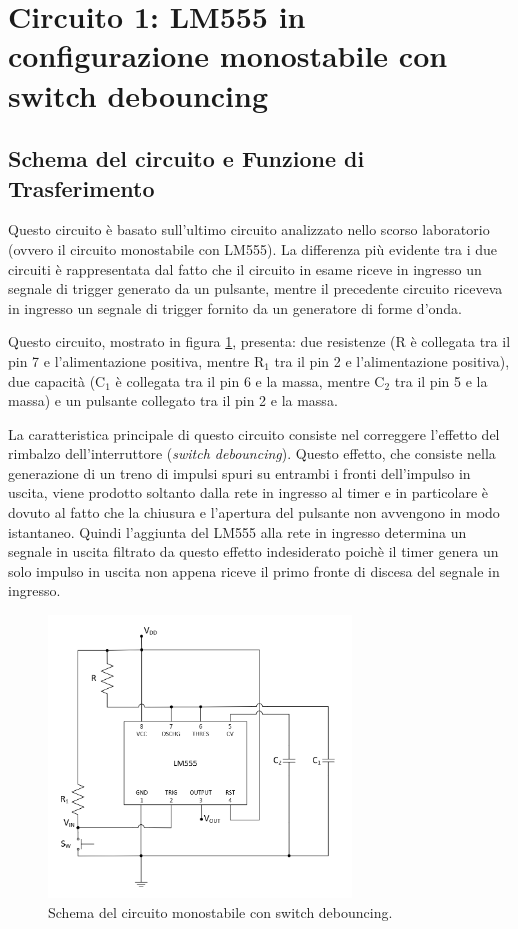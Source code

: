 \documentclass{report}
\begin{document}
\newpage
\section{Circuito 1: LM555 in configurazione monostabile con switch debouncing}
\subsection{Schema del circuito e Funzione di Trasferimento}
Questo circuito è basato sull'ultimo circuito analizzato nello scorso laboratorio (ovvero il circuito monostabile con LM555). La differenza più evidente tra i due circuiti è rappresentata dal fatto che il circuito in esame riceve in ingresso un segnale di trigger generato da un pulsante, mentre il precedente circuito riceveva in ingresso un segnale di trigger fornito da un generatore di forme d'onda.

Questo circuito, mostrato in figura \ref{figura:schema1}, presenta: due resistenze (R è collegata tra il pin 7 e l'alimentazione positiva, mentre $\mathrm{R_1}$ tra il pin 2 e l'alimentazione positiva), due capacità ($\mathrm{C_1}$ è collegata tra il pin 6 e la massa, mentre $\mathrm{C_2}$ tra il pin 5 e la massa) e un pulsante collegato tra il pin 2 e la massa.

La caratteristica principale di questo circuito consiste nel correggere l'effetto del rimbalzo dell'interruttore (\textit{switch debouncing}). Questo effetto, che consiste nella generazione di un treno di impulsi spuri su entrambi i fronti dell'impulso in uscita, viene prodotto soltanto dalla rete in ingresso al timer e in particolare è dovuto al fatto che la chiusura e l'apertura del pulsante non avvengono in modo istantaneo. Quindi l'aggiunta del LM555 alla rete in ingresso determina un segnale in uscita filtrato da questo effetto indesiderato poichè il timer genera un solo impulso in uscita non appena riceve il primo fronte di discesa del segnale in ingresso.

\begin{figure}[h!]
	\centering
	\includegraphics[height=7.5cm]{immagini/schema1}
	\caption{Schema del circuito monostabile con switch debouncing.}
	\label{figura:schema1}
\end{figure}
\end{document}

